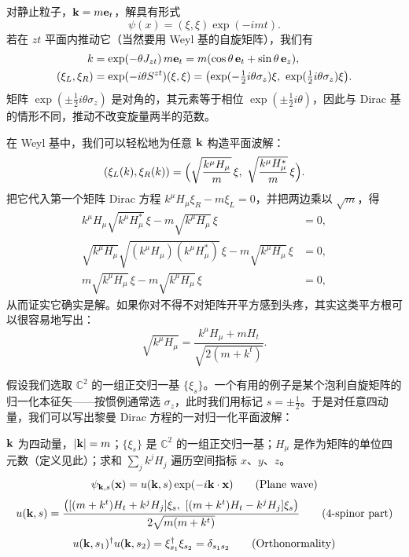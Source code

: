 对静止粒子，$\mathbf{k}=m\mathbf{e}_{t}$，解具有形式
\begin{equation}
\psi(x)=(\xi,\xi)\exp(-imt).
\end{equation}
若在 $zt$ 平面内推动它（当然要用 Weyl 基的自旋矩阵），我们有
\begin{align*}
k &= \exp(-\theta J_{zt})\,m\mathbf{e}_{t}=m(\cos\theta\,\mathbf{e}_{t}+\sin\theta\,\mathbf{e}_{z}),\\
(\xi_{L},\xi_{R}) &= \exp(-i\theta S^{zt})(\xi,\xi)
=\bigl(\exp(-\tfrac12 i\theta\sigma_{z})\xi,\ \exp(\tfrac12 i\theta\sigma_{z})\xi\bigr).
\end{align*}
矩阵 $\exp(\pm\tfrac12 i\theta\sigma_{z})$ 是对角的，其元素等于相位 $\exp(\pm\tfrac12 i\theta)$，因此与 Dirac 基的情形不同，推动不改变旋量两半的范数。

在 Weyl 基中，我们可以轻松地为任意 $\mathbf{k}$ 构造平面波解：
\begin{equation}
(\xi_{L}(k),\xi_{R}(k))
=\Bigl(\sqrt{\frac{k^{\mu}H_{\mu}}{m}}\,\xi,\
\sqrt{\frac{k^{\mu}H_{\mu}^{*}}{m}}\,\xi\Bigr).
\end{equation}
把它代入第一个矩阵 Dirac 方程 $k^{\mu}H_{\mu}\xi_{R}-m\xi_{L}=0$，并把两边乘以 $\sqrt m$，得
\begin{align*}
k^{\mu}H_{\mu}\sqrt{k^{\mu}H_{\mu}^{*}}\,\xi-m\sqrt{k^{\mu}H_{\mu}}\,\xi &= 0,\\
\sqrt{k^{\mu}H_{\mu}}\sqrt{(k^{\mu}H_{\mu})(k^{\mu}H_{\mu}^{*})}\,\xi-m\sqrt{k^{\mu}H_{\mu}}\,\xi &= 0,\\
m\sqrt{k^{\mu}H_{\mu}}\,\xi-m\sqrt{k^{\mu}H_{\mu}}\,\xi &= 0,
\end{align*}
从而证实它确实是解。如果你对不得不对矩阵开平方感到头疼，其实这类平方根可以很容易地写出：
\begin{equation}
\sqrt{k^{\mu}H_{\mu}}=\frac{k^{\mu}H_{\mu}+mH_{t}}{\sqrt{2(m+k^{t})}}.
\end{equation}

假设我们选取 $\mathbb{C}^{2}$ 的一组正交归一基 $\{\xi_{s}\}$。一个有用的例子是某个泡利自旋矩阵的归一化本征矢——按惯例通常选 $\sigma_{z}$，此时我们用标记 $s=\pm\tfrac12$。于是对任意四动量，我们可以写出黎曼 Dirac 方程的一对归一化平面波解：

\begin{keybox}
$\mathbf{k}$ 为四动量，$|\mathbf{k}|=m$；$\{\xi_{s}\}$ 是 $\mathbb{C}^{2}$ 的一组正交归一基；$H_{\mu}$ 是作为矩阵的单位四元数（定义见此）；求和 $\sum_j k^{j}H_{j}$ 遍历空间指标 $x$、$y$、$z$。
\begin{equation}
\psi_{\mathbf{k},s}(\mathbf{x})=u(\mathbf{k},s)\exp(-i\mathbf{k}\cdot\mathbf{x}) \tag{Plane wave}
\end{equation}
\begin{equation}
u(\bk,s)=\frac{\bigl([(m+k^{t})H_{t}+k^{j}H_{j}]\xi_{s},\ [(m+k^{t})H_{t}-k^{j}H_{j}]\xi_{s}\bigr)}{2\sqrt{m(m+k^{t})}} \tag{4-spinor part}
\end{equation}
\begin{equation}
u(\mathbf{k},s_{1})^{\dagger}u(\mathbf{k},s_{2})=\xi_{s_{1}}^{\dagger}\xi_{s_{2}}=\delta_{s_{1}s_{2}} \tag{Orthonormality}
\end{equation}
\end{keybox}

